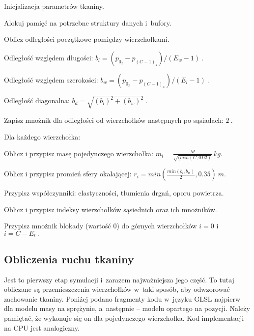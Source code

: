 		\begin{algorithm}
			\label{alg_5_4}
			\caption{Inicjalizacja parametrów tkaniny.}	
			
			Alokuj pamięć na potrzebne struktury danych i~bufory.
			
			Oblicz odległości początkowe pomiędzy wierzchołkami.
			
			\Indp
			
				Odległość względem długości: \( b_{l} = (p_{0_{z}} - p_{(C-1)_{z}}) / (E_{w} - 1) \ . \)
				
				Odległość względem szerokości: \( b_{w} = (p_{0_{x}} - p_{(C-1)_{x}}) / (E_{l} - 1) \ . \)
				
				Odległość diagonalna: \( b_{d} = \sqrt{ (b_{l})^{2} + (b_{w})^2 } \ . \)
				
				Zapisz mnożnik dla odległości od wierzchołków następnych po sąsiadach: \(2 \ .\)
			
			\Indm
			
			Dla każdego wierzchołka:
			
			\Indp
			
				Oblicz i przypisz masę pojedynczego wierzchołka: \( m_{i} = \frac{M}{\sqrt{(min(C, 0.02)}} \  kg. \)
				
				Oblicz i przypisz promień sfery okalającej: \( r_{i} = min( \frac{min(b_{l}, b_{w})}{2}, 0.35 ) \ m. \)
				
				Przypisz współczynniki: elastyczności, tłumienia drgań, oporu powietrza.
				
				Oblicz i przypisz indeksy wierzchołków sąsiednich oraz ich mnożników.
			
			\Indm
			
			Przypisz mnożnik blokady (wartość \(0\)) do górnych wierzchołków \(i = 0\) i \(i = C - E_{l} \ .\)
			
		\end{algorithm}
			
		\subsection{Obliczenia ruchu tkaniny}
		\label{t:symulacja:dzialanie:ruch}
			
		
		Jest to pierwszy etap symulacji i~zarazem najważniejsza jego część. To tutaj obliczane są przemieszczenia wierzchołków w~taki sposób, aby odwzorować zachowanie tkaniny. Poniżej podano fragmenty kodu w~języku GLSL najpierw dla modelu masy na sprężynie, a~następnie -- modelu opartego na pozycji. Należy pamiętać, że wykonuje się on dla pojedynczego wierzchołka. Kod implementacji na CPU jest analogiczny.
		\newpage	
		
